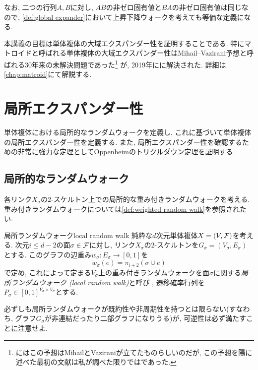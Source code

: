なお, 二つの行列$A,B$に対し, $AB$の非ゼロ固有値と$BA$の非ゼロ固有値は同じなので, \cref{def:global expander}において上昇下降ウォークを考えても等価な定義になる.

本講義の目標は単体複体の大域エクスパンダー性を証明することである.
特にマトロイドと呼ばれる単体複体の大域エクスパンダー性はMihail--Vazirani予想\cite{balanced_matroids}と呼ばれる30年来の未解決問題であった\footnote{\cite{balanced_matroids}にはこの予想はMihailとVaziraniが立てたものらしいのだが, この予想を陽に述べた最初の文献は私が調べた限りでは\citet{balanced_matroids}であった.}
が, 2019年に\citet{ALOV24}に解決された.
詳細は\cref{chap:matroid}にて解説する.


\section{局所エクスパンダー性}
単体複体における局所的なランダムウォークを定義し, これに基づいて単体複体の局所エクスパンダー性を定義する.
また, 局所エクスパンダー性を確認するための非常に強力な定理としてOppenheimのトリクルダウン定理を証明する.

\subsection{局所的なランダムウォーク}
各リンク$X_\sigma$の$2$-スケルトン上での局所的な重み付きランダムウォークを考える.
重み付きランダムウォークについては\cref{def:weighted random walk}を参照されたい.
%
\begin{definition}{局所ランダムウォーク}{local random walk}
    純粋な$d$次元単体複体$X = (V,\mathcal{F})$を考える.
    次元$i \le d-2$の面$\sigma \in \mathcal{F}$に対し,
        リンク$X_\sigma$の$2$-スケルトンを$G_\sigma = (V_\sigma,E_\sigma)$とする.
    このグラフの辺重み$w_\sigma\colon E_\sigma \to [0,1]$を
    \[ w_\sigma(e) = \pi_{i+2}(\sigma\cup e) \]
    で定め, これによって定まる$V_\sigma$上の重み付きランダムウォークを面$\sigma$に関する\emph{局所ランダムウォーク (local random walk)}と呼び%
    , 遷移確率行列を$P_\sigma\in [0,1]^{V_\sigma\times V_\sigma}$とする.
\end{definition}
%
必ずしも局所ランダムウォークが既約性や非周期性を持つとは限らない(すなわち, グラフ$G_\sigma$が非連結だったり二部グラフになりうる)が,
可逆性は必ず満たすことに注意せよ.

